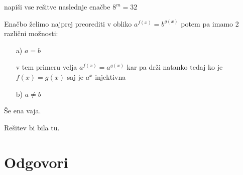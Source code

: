 \begin{vaja}
  napiši vse rešitve naslednje enačbe \( 8^m=32\)

  \begin{odgovor}
   Enačbo želimo najprej  preorediti v obliko $a^{f(x)}=b^{g(x)}$ potem pa imamo 2 različni možnosti:
	\begin{itemize}
		\item[a)] $a=b$ 

			v tem primeru velja $a^{f(x)}=a^{g(x)}$ kar pa drži natanko tedaj ko je $f(x)=g(x)$ saj je $a^x$ injektivna
			
		\item[b)] $a\neq b$
	\end{itemize}
  \end{odgovor}
\end{vaja}

\begin{vaja}
  Še ena vaja.

  \begin{odgovor}
    Rešitev bi bila tu.
  \end{odgovor}
\end{vaja}




\section{Odgovori}
\label{sec:explog-odgovori}




